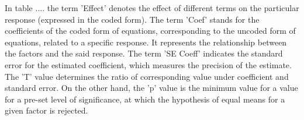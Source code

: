 In table .... the term 'Effect' denotes the effect of different terms on the particular 
response (expressed in the coded form). The term 'Coef' stands for the coefficients of the 
coded form of equations, corresponding to the uncoded form of equations, related to a specific 
response. It represents the relationship between the factors and the said response. The term 
'SE Coeff' indicates the standard error for the estimated coefficient, which measures the precision 
of the estimate. The 'T' value determines the ratio of corresponding value under coefficient and 
standard error. On the other hand, the 'p' value is the minimum value for a value for a pre-set level 
of significance, at which the hypothesis of equal means for a given factor is rejected. 
